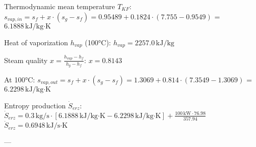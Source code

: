 Thermodynamic mean temperature \( T_{KF} \):  
\( s_{vap,in} = s_f + x \cdot (s_g - s_f) = 0.95489 + 0.1824 \cdot (7.755 - 0.9549) \)  
= \( 6.1888 \, \text{kJ/kg·K} \)  

Heat of vaporization \( h_{vap} \) (100°C):  
\( h_{vap} = 2257.0 \, \text{kJ/kg} \)  

Steam quality \( x = \frac{h_{vap} - h_f}{h_g - h_f} \):  
\( x = 0.8143 \)  

At 100°C:  
\( s_{vap,out} = s_f + x \cdot (s_g - s_f) = 1.3069 + 0.814 \cdot (7.3549 - 1.3069) \)  
= \( 6.2298 \, \text{kJ/kg·K} \)  

Entropy production \( \dot{S}_{erz} \):  
\( \dot{S}_{erz} = 0.3 \, \text{kg/s} \cdot \left[ 6.1888 \, \text{kJ/kg·K} - 6.2298 \, \text{kJ/kg·K} \right] + \frac{100 \, \text{kW} \cdot 76.98}{357.94} \)  
\( \dot{S}_{erz} = 0.6948 \, \text{kJ/s·K} \)  

---